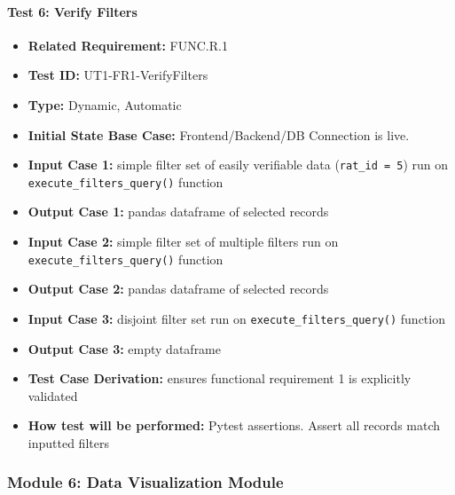 \documentclass[12pt, titlepage]{article}
\begin{document}
\begin{flushleft}
\paragraph{Test 6: Verify Filters}
\begin{itemize}
    \item \textbf{Related Requirement:} FUNC.R.1
    \item \textbf{Test ID:} UT1-FR1-VerifyFilters
    \item \textbf{Type:} Dynamic, Automatic
    \item \textbf{Initial State Base Case:} Frontend/Backend/DB Connection is live.
    \item \textbf{Input Case 1:} simple filter set of easily verifiable data (\texttt{rat\_id = 5}) run on \texttt{execute\_filters\_query()} function
    \item \textbf{Output Case 1:} pandas dataframe of selected records
    \item \textbf{Input Case 2:} simple filter set of multiple filters run on \texttt{execute\_filters\_query()} function
    \item \textbf{Output Case 2:} pandas dataframe of selected records
    \item \textbf{Input Case 3:} disjoint filter set run on \texttt{execute\_filters\_query()} function
    \item \textbf{Output Case 3:} empty dataframe
    \item \textbf{Test Case Derivation:} ensures functional requirement 1 is explicitly validated
    \item \textbf{How test will be performed:} Pytest assertions. Assert all records match inputted filters
\end{itemize}

\subsubsection{Module 6: Data Visualization Module}


\end{flushleft}
\end{document}
